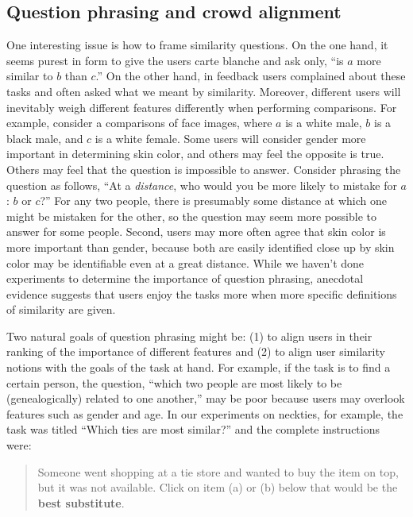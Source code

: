 \documentclass{article}
\begin{document}
\subsection{Question phrasing and crowd alignment}
One interesting issue is how to frame similarity questions.  On the
one hand, it seems purest in form to give the users carte blanche and
ask only, ``is $a$ more similar to $b$ than $c$.''  On the other hand,
in feedback users complained about these tasks and often asked what we
meant by similarity.  Moreover, different users will inevitably weigh
different features differently when performing comparisons.  For
example, consider a comparisons of face images, where $a$ is a white
male, $b$ is a black male, and $c$ is a white female.  Some users will
consider gender more important in determining skin color, and others
may feel the opposite is true.  Others may feel that the question is
impossible to answer.  Consider phrasing the question as follows, ``At
a {\em distance}, who would you be more likely to mistake for $a$: $b$
or $c$?''  For any two people, there is presumably some distance at
which one might be mistaken for the other, so the question may seem
more possible to answer for some people.  Second, users may more often
agree that skin color is more important than gender, because both are
easily identified close up by skin color may be identifiable even at a
great distance.  While we haven't done experiments to determine the
importance of question phrasing, anecdotal evidence suggests that
users enjoy the tasks more when more specific definitions of
similarity are given.

Two natural goals of question phrasing might be: (1) to align users in
their ranking of the importance of different features and (2) to align
user similarity notions with the goals of the task at hand.  For
example, if the task is to find a certain person, the question,
``which two people are most likely to be (genealogically) related to
one another,'' may be poor because users may overlook features such as
gender and age.  In our experiments on neckties, for example, the task
was titled ``Which ties are most similar?'' and the complete
instructions were:

\begin{quote}
  Someone went shopping at a tie store and wanted to buy the item on
  top, but it was not available. Click on item (a) or (b) below that
  would be the {\bf best substitute}.
\end{quote}
\end{document}
